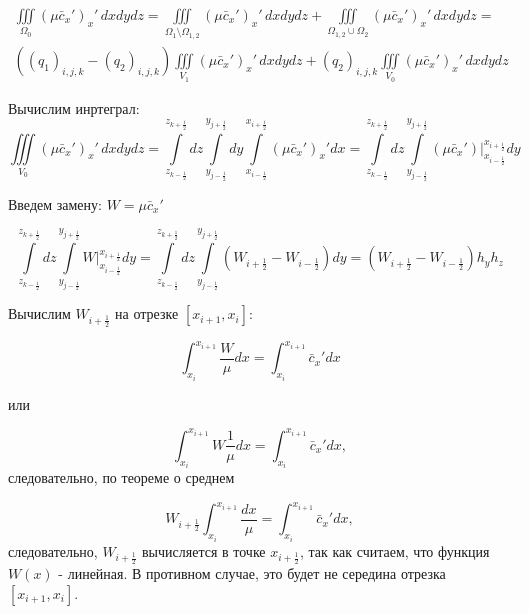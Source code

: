 \documentclass[12pt]{article}
\begin{document}
\begin{multline*} 
	\iiint\limits_{\Omega_0} (\mu\bar{c}_x')_x'\,dxdydz = \iiint\limits_{\Omega_1\setminus\Omega_{1,2}} (\mu\bar{c}_x')_x'\,dxdydz + \iiint\limits_{\Omega_{1,2}\cup\Omega_2}(\mu\bar{c}_x')_x'\,dxdydz = \\
	((q_1)_{i,j,k} - (q_2)_{i,j,k})\iiint\limits_{V_1} (\mu\bar{c}_x')_x'\,dxdydz + (q_2)_{i,j,k}\iiint\limits_{V_0} (\mu\bar{c}_x')_x'\,dxdydz
\end{multline*}

Вычислим инртеграл:
\begin{equation*}
\iiint\limits_{V_0} (\mu\bar{c}_x')_x'\,dxdydz = \int\limits_{z_{k-\frac{1}{2}}}^{z_{k+\frac{1}{2}}}dz \int\limits_{y_{j-\frac{1}{2}}}^{y_{j+\frac{1}{2}}}dy\int\limits_{x_{i-\frac{1}{2}}}^{x_{i+\frac{1}{2}}}(\mu\bar{c}_x')_x'dx = \int\limits_{z_{k-\frac{1}{2}}}^{z_{k+\frac{1}{2}}}dz \int\limits_{y_{j-\frac{1}{2}}}^{y_{j+\frac{1}{2}}}(\mu\bar{c}_x')\bigg|_{x_{i-\frac{1}{2}}}^{x_{i+\frac{1}{2}}}dy
\end{equation*}

Введем замену:
$W=\mu\bar{c}_x'$

\begin{equation*}
	\int\limits_{z_{k-\frac{1}{2}}}^{z_{k+\frac{1}{2}}}dz \int\limits_{y_{j-\frac{1}{2}}}^{y_{j+\frac{1}{2}}}W\bigg|_{x_{i-\frac{1}{2}}}^{x_{i+\frac{1}{2}}}dy = \int\limits_{z_{k-\frac{1}{2}}}^{z_{k+\frac{1}{2}}}dz \int\limits_{y_{j-\frac{1}{2}}}^{y_{j+\frac{1}{2}}}(W_{i+\frac{1}{2}}- W_{i-\frac{1}{2}})dy = (W_{i+\frac{1}{2}}- W_{i-\frac{1}{2}})h_yh_z
\end{equation*}	
	
	Вычислим $W_{i+\frac{1}{2}}$ на отрезке $[x_{i+1},x_i]$:
	
\begin{equation*}
	\int_{x_i}^{x_{i+1}}\frac{W}{\mu}dx = \int_{x_i}^{x_{i+1}}\bar{c}_x'dx
\end{equation*}

или

\begin{equation*}
	\int_{x_i}^{x_{i+1}}W\frac{1}{\mu}dx = \int_{x_i}^{x_{i+1}}\bar{c}_x'dx,
\end{equation*}
следовательно, по теореме о среднем

\begin{equation*}
	W_{i+\frac{1}{2}}\int_{x_i}^{x_{i+1}}\frac{dx}{\mu}=\int_{x_i}^{x_{i+1}}\bar{c}_x'dx,
\end{equation*}
следовательно, $W_{i+\frac{1}{2}}$ вычисляется в точке $x_{i+\frac{1}{2}}$, так как считаем, что функция $W(x)$ - линейная. 
В противном случае, это будет не середина отрезка  $[x_{i+1},x_i]$.
 
\end{document}
